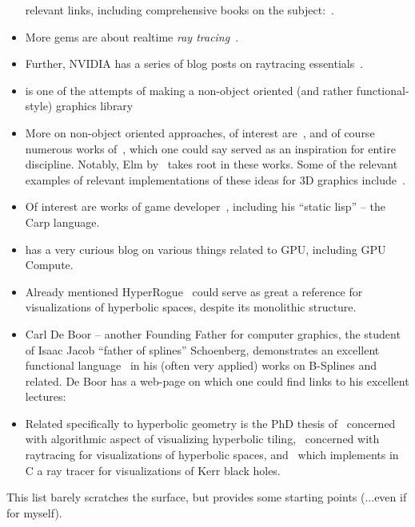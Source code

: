 \begin{itemize}
relevant links, including comprehensive books on the subject:~\citet{rtrIntersections}.
\item More gems are about realtime \emph{ray tracing}~\citet{rtGems}.
\item Further, NVIDIA has a series of blog posts on raytracing
essentials~\cite{rtEssentials}.
\item \citet{yoctoGL} is one of the attempts of making a non-object oriented
(and rather functional-style) graphics library
\item More on non-object oriented approaches, of interest
are~\citet{functional3DGraphics,elliottTBAG}, and of course numerous works
of~\citet{ActiveVRML,elliottAnimations}, which one could say served as an
inspiration for entire discipline. Notably, Elm by~\citet{elm} takes root in
these works. Some of the relevant examples of relevant implementations
of these ideas for 3D graphics include~\citet{muncheongFunctionalGames}.
\item Of interest are works of game developer~\citet{carpLang}, including his
``static lisp'' -- the Carp language.
\item \citet{levienPrefixSum} has a very curious blog on various things related
to GPU, including GPU Compute.
\item Already mentioned HyperRogue~\cite{hyperrogue} could serve as great a
reference for visualizations of hyperbolic spaces, despite its monolithic
structure.
\item Carl De Boor -- another Founding Father for computer graphics, the student of Isaac Jacob
``father of splines'' Schoenberg, demonstrates an excellent functional
language~\cite{deboorSmoothingBspl}
in his (often very applied) works on B-Splines and related. De Boor has a web-page
on which one could find links to his excellent lectures:~\cite{deboorPage}
\item Related specifically to hyperbolic geometry is the PhD thesis
of~\citet{von2014creating} concerned with algorithmic aspect of visualizing
hyperbolic tiling,~\citet{hypRtBelgrade} concerned with raytracing for
visualizations of hyperbolic spaces, and~\citet{kerrBlackholes} which
implements in C a ray tracer for visualizations of Kerr black holes.
\end{itemize}

This list barely scratches the surface, but provides some starting points
(...even if for myself).
